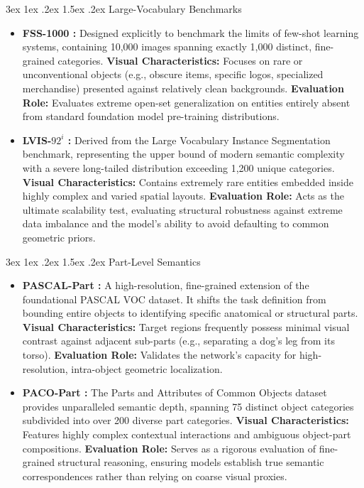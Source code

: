 \documentclass[journal,12pt,onecolumn,draftclsnofoot]{IEEEtran}
\makeatletter
\renewcommand{\subsection}{\@startsection{subsection}{2}{\z@}%
    {3ex \@plus 1ex \@minus .2ex}%
    {1.5ex \@plus.2ex}%
    {\normalfont\large\bfseries}}
\makeatother
\begin{document}
\subsection{Large-Vocabulary Benchmarks}
\begin{itemize}
    \item \textbf{FSS-1000 \cite{li2020fss}:} Designed explicitly to benchmark the limits of few-shot learning systems, containing 10,000 images spanning exactly 1,000 distinct, fine-grained categories.
    \textbf{Visual Characteristics:} Focuses on rare or unconventional objects (e.g., obscure items, specific logos, specialized merchandise) presented against relatively clean backgrounds.
    \textbf{Evaluation Role:} Evaluates extreme open-set generalization on entities entirely absent from standard foundation model pre-training distributions.
    
    \item \textbf{LVIS-$92^i$ \cite{gupta2019lvis}:} Derived from the Large Vocabulary Instance Segmentation benchmark, representing the upper bound of modern semantic complexity with a severe long-tailed distribution exceeding 1,200 unique categories.
    \textbf{Visual Characteristics:} Contains extremely rare entities embedded inside highly complex and varied spatial layouts.
    \textbf{Evaluation Role:} Acts as the ultimate scalability test, evaluating structural robustness against extreme data imbalance and the model's ability to avoid defaulting to common geometric priors.
\end{itemize}

\subsection{Part-Level Semantics}
\begin{itemize}
    \item \textbf{PASCAL-Part \cite{chen2014detect}:} A high-resolution, fine-grained extension of the foundational PASCAL VOC dataset. It shifts the task definition from bounding entire objects to identifying specific anatomical or structural parts.
    \textbf{Visual Characteristics:} Target regions frequently possess minimal visual contrast against adjacent sub-parts (e.g., separating a dog's leg from its torso).
    \textbf{Evaluation Role:} Validates the network's capacity for high-resolution, intra-object geometric localization.
    
    \item \textbf{PACO-Part \cite{ramanathan2023paco}:} The Parts and Attributes of Common Objects dataset provides unparalleled semantic depth, spanning 75 distinct object categories subdivided into over 200 diverse part categories.
    \textbf{Visual Characteristics:} Features highly complex contextual interactions and ambiguous object-part compositions.
    \textbf{Evaluation Role:} Serves as a rigorous evaluation of fine-grained structural reasoning, ensuring models establish true semantic correspondences rather than relying on coarse visual proxies.
\end{itemize}
\end{document}
